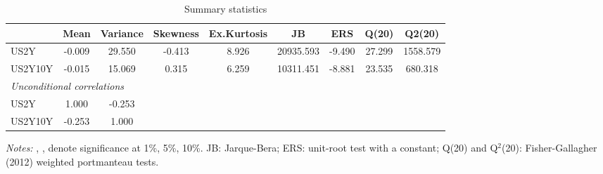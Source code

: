 \begin{table}[htbp]\centering
\caption{Summary statistics}\label{tab:descriptive}
\begin{tabular}{lcccccccc}
\toprule
 & Mean & Variance & Skewness & Ex.Kurtosis & JB & ERS & Q(20) & Q2(20) \\
\midrule
US2Y & -0.009 & 29.550 & -0.413\sym{***} & 8.926\sym{***} & 20935.593\sym{***} & -9.490\sym{***} & 27.299\sym{***} & 1558.579\sym{***} \\
US2Y10Y & -0.015 & 15.069 & 0.315\sym{***} & 6.259\sym{***} & 10311.451\sym{***} & -8.881\sym{***} & 23.535\sym{***} & 680.318\sym{***} \\
\midrule
\multicolumn{9}{l}{\textit{Unconditional correlations}} \\
US2Y & 1.000 & -0.253 &  &  &  &  &  &  \\
US2Y10Y & -0.253 & 1.000 &  &  &  &  &  &  \\
\bottomrule
\end{tabular}
\par\smallskip\begin{minipage}{0.95\linewidth}\footnotesize\textit{Notes:} \sym{***}, \sym{**}, \sym{*} denote significance at 1\%, 5\%, 10\%. JB: Jarque-Bera; ERS: unit-root test with a constant; Q(20) and Q$^2$(20): Fisher-Gallagher (2012) weighted portmanteau tests.\end{minipage}
\end{table}
